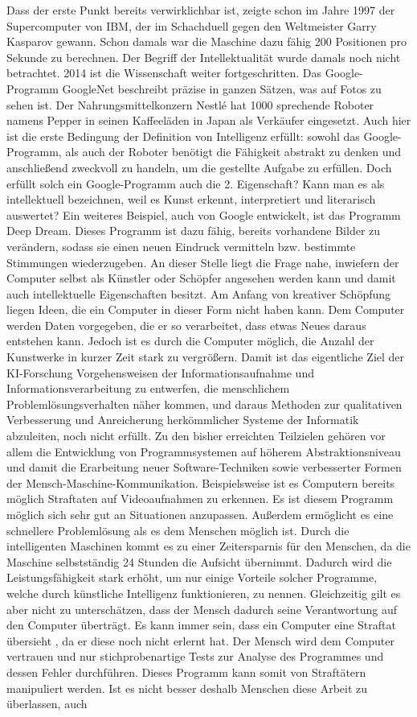 Dass der erste Punkt bereits verwirklichbar ist, zeigte schon im Jahre 1997 der Supercomputer von IBM, der im Schachduell gegen den Weltmeister Garry Kasparov gewann. Schon damals war die Maschine dazu fähig 200 Positionen pro Sekunde zu berechnen. Der Begriff der Intellektualität wurde damals noch nicht betrachtet. 2014 ist die Wissenschaft weiter fortgeschritten. Das Google-Programm GoogleNet beschreibt präzise in ganzen Sätzen, was auf Fotos zu sehen ist.  Der Nahrungsmittelkonzern Nestlé hat 1000 sprechende Roboter namens Pepper in seinen Kaffeeläden in Japan als Verkäufer eingesetzt.  Auch hier ist die erste Bedingung der Definition von Intelligenz erfüllt: sowohl das Google-Programm, als auch der Roboter benötigt die Fähigkeit abstrakt zu denken und anschließend zweckvoll zu handeln, um die gestellte Aufgabe zu erfüllen. Doch erfüllt solch ein Google-Programm auch die 2. Eigenschaft? Kann man es als intellektuell bezeichnen, weil es Kunst erkennt, interpretiert und literarisch auswertet? Ein weiteres Beispiel, auch von Google entwickelt, ist das Programm \glqq Deep Dream\grqq. Dieses Programm ist dazu fähig, bereits vorhandene Bilder zu verändern, sodass sie einen neuen Eindruck vermitteln bzw. bestimmte Stimmungen wiederzugeben.  An dieser Stelle liegt die Frage nahe, inwiefern der Computer selbst als Künstler oder Schöpfer angesehen werden kann und damit auch intellektuelle Eigenschaften besitzt. Am Anfang von kreativer Schöpfung liegen Ideen, die ein Computer in dieser Form nicht haben kann. Dem Computer werden Daten vorgegeben, die er so verarbeitet, dass etwas Neues daraus entstehen kann. Jedoch ist es durch die Computer möglich, die Anzahl der Kunstwerke in kurzer Zeit stark zu vergrößern. Damit ist das eigentliche Ziel der KI-Forschung Vorgehensweisen der Informationsaufnahme und Informationsverarbeitung zu entwerfen, die menschlichem Problemlösungsverhalten näher kommen, und daraus Methoden zur qualitativen Verbesserung und Anreicherung herkömmlicher Systeme der Informatik abzuleiten, noch nicht erfüllt. Zu den bisher erreichten Teilzielen gehören vor allem die Entwicklung von Programmsystemen auf höherem Abstraktionsniveau und damit die Erarbeitung neuer Software-Techniken sowie verbesserter Formen der Mensch-Maschine-Kommunikation. Beispielsweise ist es Computern bereits möglich Straftaten auf Videoaufnahmen zu erkennen. Es ist diesem Programm möglich sich sehr gut an Situationen anzupassen. Außerdem ermöglicht es eine schnellere Problemlösung als es dem Menschen möglich ist. Durch die intelligenten Maschinen kommt es zu einer Zeitersparnis für den Menschen, da die Maschine selbstständig 24 Stunden die Aufsicht übernimmt. Dadurch wird die Leistungsfähigkeit stark erhöht, um nur einige Vorteile solcher Programme, welche durch künstliche Intelligenz funktionieren, zu nennen. Gleichzeitig gilt es aber nicht zu unterschätzen, dass der Mensch dadurch seine Verantwortung auf den Computer überträgt. Es kann immer sein, dass ein Computer eine Straftat \glqq übersieht \grqq, da er diese noch nicht erlernt hat. Der Mensch wird dem Computer vertrauen und nur stichprobenartige Tests zur Analyse des Programmes und dessen Fehler durchführen. Dieses Programm kann somit von Straftätern manipuliert werden. Ist es nicht besser deshalb Menschen diese Arbeit zu überlassen, auch 